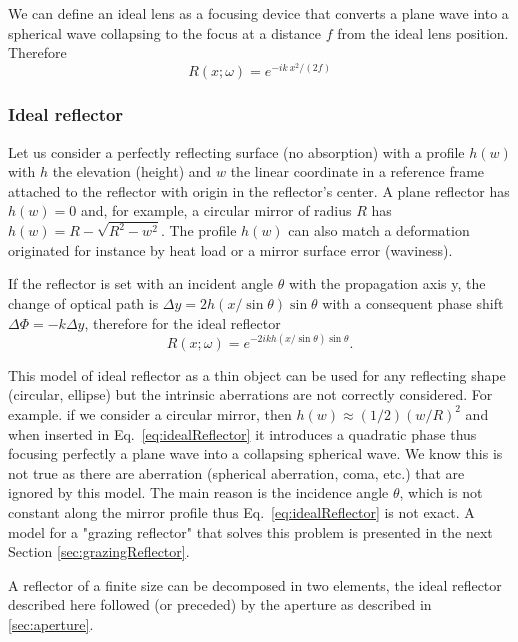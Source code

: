 \documentclass[preprint]{iucr}              %
\begin{document}
We can define an ideal lens as a focusing device that converts a plane wave into a spherical wave collapsing to the focus at a distance $f$ from the ideal lens position. Therefore
\begin{equation}
    R(x;\omega) = e^{-i k~x^2/(2 f)}
\end{equation}

\subsubsection{Ideal reflector}
\label{sec:idealReflector}

Let us consider a perfectly reflecting surface (no absorption) with a profile $h(w)$ with $h$ the elevation (height) and $w$ the linear coordinate in a reference frame attached to the reflector with origin in the reflector's center. A plane reflector has $h(w)=0$ and, for example, a circular mirror of radius $R$ has $h(w)=R-\sqrt{R^2 - w^2}$. The profile $h(w)$ can also match a deformation originated for instance by heat load or a mirror surface error (waviness).

If the reflector is set with an incident angle $\theta$ with the propagation axis y, the change of optical path is $\Delta y = 2 h(x/\sin \theta) \sin \theta$ with a consequent phase shift $\Delta \Phi = - k \Delta y $, therefore for the ideal reflector
\begin{equation}
\label{eq:idealReflector}
    R(x;\omega) = e^{-2 i k h(x/\sin \theta) \sin \theta}.
\end{equation} 

This model of ideal reflector as a thin object  can be used for any reflecting shape (circular, ellipse) but the intrinsic aberrations are not correctly considered. For example. if we consider a circular mirror, then $h(w) \approx (1/2) (w/R)^2$ and when inserted in Eq.~\ref{eq:idealReflector} it introduces a quadratic phase thus focusing perfectly a plane wave into a collapsing spherical wave. We know this is not true as there are aberration (spherical aberration, coma, etc.) that are ignored by this model. The main reason is the incidence angle $\theta$, which is not constant along the mirror profile thus Eq.~\ref{eq:idealReflector} is not exact. A model for a "grazing reflector" that solves this problem is presented in the next Section \ref{sec:grazingReflector}.

A reflector of a finite size can be decomposed in two elements, the ideal reflector described here followed (or preceded) by the aperture as described in \ref{sec:aperture}.
\end{document}
